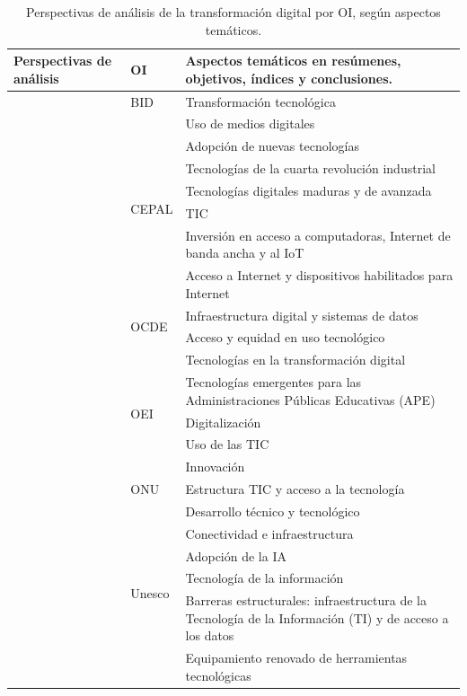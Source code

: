 \begin{longtable}{
>{\raggedright\arraybackslash}p{} l >{\raggedright\arraybackslash}p{}}
\caption{Perspectivas de análisis de la transformación digital por OI, según aspectos temáticos.}
\label{tab-11}\\
\toprule
Perspectivas de análisis & OI & Aspectos temáticos en resúmenes, objetivos, índices y conclusiones.\\
\midrule
    \multirow{22}{=}{Aspecto tecnológico} & BID & Transformación
    tecnológica \\
    & \multirow{7}{*}{CEPAL} & Uso de medios digitales \\
    & & Adopción de nuevas tecnologías \\
    & & Tecnologías de la cuarta revolución industrial \\
    & & Tecnologías digitales maduras y de avanzada \\
    & & TIC \\
    & & Inversión en acceso a computadoras, Internet de banda ancha y al
    IoT \\
    & & Acceso a Internet y dispositivos habilitados para Internet \\
    & \multirow{2}{*}{OCDE} & Infraestructura digital y sistemas de datos \\
    & & Acceso y equidad en uso tecnológico \\
    & \multirow{5}{*}{OEI} & Tecnologías en la transformación digital \\
    & & Tecnologías emergentes para las Administraciones Públicas Educativas
    (APE) \\
    & & Digitalización \\
    & & Uso de las TIC \\
    & & Innovación \\
    & ONU & Estructura TIC y acceso a la tecnología \\
    & \multirow{6}{*}{Unesco} & Desarrollo técnico y tecnológico \\
    & & Conectividad e infraestructura \\
    & & Adopción de la IA \\
    & & Tecnología de la información \\
    & & Barreras estructurales: infraestructura de la Tecnología de la
    Información (TI) y de acceso a los datos \\
    & & Equipamiento renovado de herramientas tecnológicas \\

\end{longtable}
